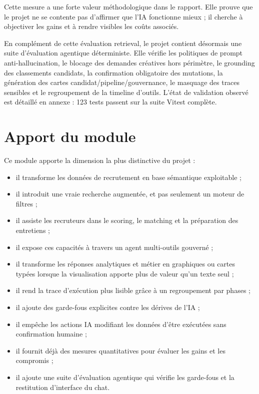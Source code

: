 Cette mesure a une forte valeur méthodologique dans le rapport. Elle prouve que le projet ne se contente pas d'affirmer que l'IA fonctionne mieux ; il cherche à objectiver les gains et à rendre visibles les coûts associés.

En complément de cette évaluation retrieval, le projet contient désormais une suite d'évaluation agentique déterministe. Elle vérifie les politiques de prompt anti-hallucination, le blocage des demandes créatives hors périmètre, le grounding des classements candidats, la confirmation obligatoire des mutations, la génération des cartes candidat/pipeline/gouvernance, le masquage des traces sensibles et le regroupement de la timeline d'outils. L'état de validation observé est détaillé en annexe : 123 tests passent sur la suite Vitest complète.

\section{Apport du module}
Ce module apporte la dimension la plus distinctive du projet :
\begin{itemize}
  \item il transforme les données de recrutement en base sémantique exploitable ;
  \item il introduit une vraie recherche augmentée, et pas seulement un moteur de filtres ;
  \item il assiste les recruteurs dans le scoring, le matching et la préparation des entretiens ;
  \item il expose ces capacités à travers un agent multi-outils gouverné ;
  \item il transforme les réponses analytiques et métier en graphiques ou cartes typées lorsque la visualisation apporte plus de valeur qu'un texte seul ;
  \item il rend la trace d'exécution plus lisible grâce à un regroupement par phases ;
  \item il ajoute des garde-fous explicites contre les dérives de l'IA ;
  \item il empêche les actions IA modifiant les données d'être exécutées sans confirmation humaine ;
  \item il fournit déjà des mesures quantitatives pour évaluer les gains et les compromis ;
  \item il ajoute une suite d'évaluation agentique qui vérifie les garde-fous et la restitution d'interface du chat.
\end{itemize}

